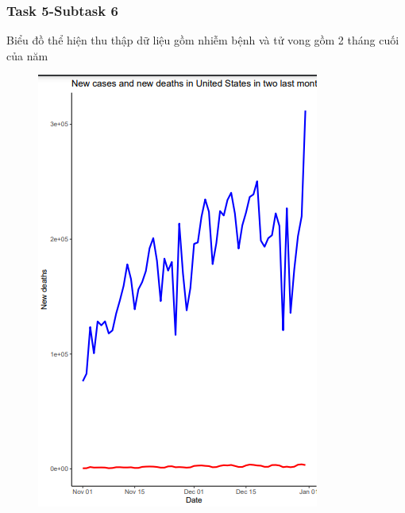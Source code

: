 \documentclass[english,10pt,table]{beamer}
\begin{document}
{
    \frametitle{Task 5-Subtask 6}
    \begin{block}{Biểu đồ thể hiện thu thập dữ liệu gồm nhiễm bệnh và tử vong gồm 2 tháng cuối của năm}
    \begin{figure}[H]
		\centering
		\includegraphics[scale=0.5]{images/5.6.3.png}
	\end{figure}
    \end{block}
}
\frame
\end{document}
